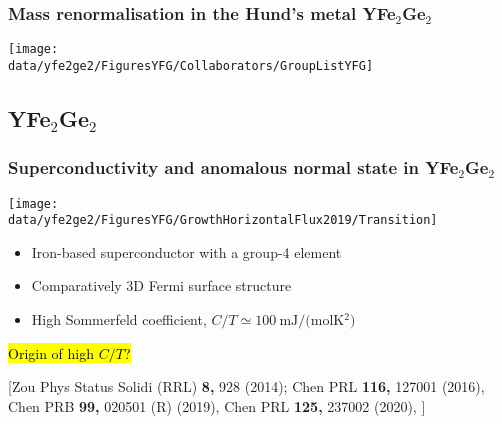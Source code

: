 
\begin{frame}[plain,label=YFGCollab]
\frametitle {Mass renormalisation in the Hund's metal YFe$_2$Ge$_2$}
\vspace{1em}
\texttt{[image: \\data/yfe2ge2/FiguresYFG/Collaborators/GroupListYFG]}
\end{frame}

\subsection{YFe$_2$Ge$_2$}
\begin{frame}[label=YFGIntro]
\frametitle{Superconductivity and anomalous normal state in YFe$_2$Ge$_2$}

\centerline{\texttt{[image: \\data/yfe2ge2/FiguresYFG/GrowthHorizontalFlux2019/Transition]} }
\begin{itemize}
\item
Iron-based superconductor with a group-4 element
\item
Comparatively 3D Fermi surface structure 
\item
High Sommerfeld coefficient, $C/T \simeq \SI{100}{\mJ/(\mol\kelvin^2)}$
\end{itemize}
\centerline{\hl{Origin of high $C/T$?}}

\vspace*{\fill}
\centerline{\makebox[\linewidth]{\rule{0.85\textwidth}{0.4pt}}}
\begin{center}
{\scriptsize [Zou Phys Status Solidi (RRL) {\bf 8,} 928
  (2014); Chen PRL {\bf 116,} 127001 (2016), Chen PRB {\bf 99,} 020501 (R) (2019), Chen PRL {\bf 125,} 237002 (2020), ]}
  \end{center}
\end{frame}





